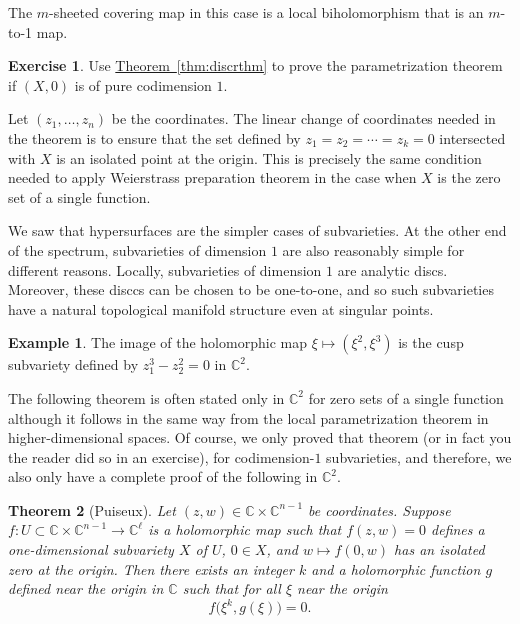 \documentclass[12pt,openany]{book}
\newcommand{\C}{{\mathbb{C}}}
\newcommand{\myindex}[1]{#1\index{#1}}
\theoremstyle{plain}
\newtheorem{thm}{Theorem}[section]
\theoremstyle{remark}
\theoremstyle{definition}
\newenvironment{exbox}{%
    \def\FrameCommand{\vrule width 1pt \relax\hspace{10pt}}%
    \MakeFramed{\advance\hsize-\width\FrameRestore}%
}{%
    \endMakeFramed
}
\theoremstyle{exercise}
\newtheorem{exercise}{Exercise}[section]
\theoremstyle{example}
\newtheorem{example}[thm]{Example}
\newcommand{\thmref}[1]{\hyperref[#1]{Theorem~\ref*{#1}}}
\begin{document}
\pagebreak[2]
The $m$-sheeted covering map in this case is a local biholomorphism
that is an $m$-to-1 map.

\begin{exbox}
\begin{exercise}
Use \thmref{thm:discrthm}
to prove the parametrization theorem if $(X,0)$ is
of pure codimension $1$.
\end{exercise}
\end{exbox}

Let $(z_1,\ldots,z_n)$ be the coordinates.
The linear change of coordinates needed in the theorem is
to ensure that the set defined by $z_1=z_2=\cdots=z_k = 0$ intersected
with $X$ is an isolated point at the origin.  This is precisely
the same condition needed to apply Weierstrass preparation theorem in the case
when $X$ is the zero set of a single function.

\medskip

We saw that hypersurfaces are the simpler cases of
subvarieties.  At the other end of the spectrum,
subvarieties of dimension $1$ are also reasonably simple for different reasons.
Locally, subvarieties of dimension $1$ are analytic discs.
Moreover, these disccs can be chosen to be one-to-one,
and so such subvarieties have a natural topological manifold structure
even at singular points.

\begin{example}
The image of the holomorphic map
$\xi \mapsto (\xi^2,\xi^3)$ is the cusp subvariety
defined by $z_1^3-z_2^2 = 0$ in $\C^2$.
\end{example}


The following theorem is often stated only in $\C^2$ for zero sets of
a single function although it follows in
the same way from the local parametrization theorem in higher-dimensional
spaces.  Of course, we only
proved that theorem (or in fact you the reader did so in an exercise), for
codimension-$1$ subvarieties, and therefore, we also only have a complete
proof of the following in $\C^2$.

\begin{thm}[\myindex{Puiseux}]
Let $(z,w) \in \C \times \C^{n-1}$ be coordinates.
Suppose $f \colon U \subset \C \times \C^{n-1} \to \C^\ell$
is a holomorphic map such that
$f(z,w) = 0$ defines a one-dimensional subvariety $X$ of $U$,
$0 \in X$,
and $w \mapsto f(0,w)$ has an isolated zero at the origin.
Then there exists an integer $k$ and a holomorphic function $g$ defined near
the origin in $\C$ such that
for all $\xi$ near the origin
\begin{equation*}
f\bigl(\xi^k,g(\xi)\bigr) = 0 .
\end{equation*}
\end{thm}
\end{document}
